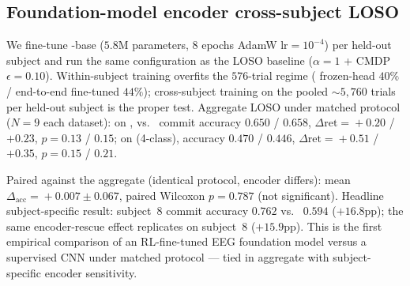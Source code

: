 \subsection{Foundation-model encoder cross-subject LOSO}\label{sec:results:labram_loso}

We fine-tune \labram{}-base ($5.8$M parameters, 8 epochs AdamW
$\text{lr}\!=\!10^{-4}$) per held-out subject and run the same
\nettype{} configuration as the \eegnet{} LOSO baseline ($\alpha=1$
+ CMDP $\epsilon=0.10$). Within-subject training overfits the
$576$-trial regime (\labram{} frozen-head $40\%$ / end-to-end
fine-tuned $44\%$); cross-subject training on the pooled
$\sim\!5{,}760$ trials per held-out subject is the proper test.
Aggregate LOSO under matched protocol ($N\!=\!9$ each dataset):
on \bcib{}, \eegnet{} vs.\ \labram{} commit accuracy
$0.650$ / $0.658$, $\Delta\text{ret}\!=\!+0.20$ / $+0.23$,
$p\!=\!0.13$ / $0.15$; on \bcia{} (4-class), accuracy
$0.470$ / $0.446$, $\Delta\text{ret}\!=\!+0.51$ / $+0.35$,
$p\!=\!0.15$ / $0.21$.

Paired against the \eegnet{} aggregate (identical protocol,
encoder differs): mean
$\Delta_{\text{acc}}\!=\!+0.007 \pm 0.067$, paired Wilcoxon
$p\!=\!0.787$ (not significant). Headline subject-specific result:
subject~8 \labram{} commit accuracy $0.762$ vs.\ \eegnet{}
$0.594$ ($+16.8$pp); the same encoder-rescue effect replicates on
\bcia{} subject~8 ($+15.9$pp). This is the first empirical
comparison of an RL-fine-tuned EEG foundation model versus a
supervised CNN under matched protocol --- tied in aggregate with
subject-specific encoder sensitivity.
